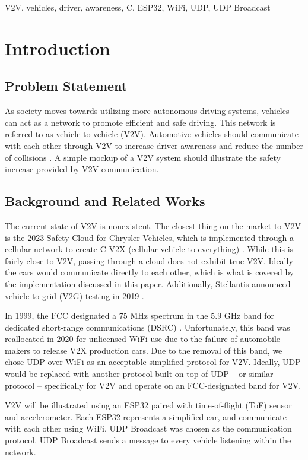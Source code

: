 \documentclass[conference]{IEEEtran}
\begin{document}
\begin{IEEEkeywords}
V2V, vehicles, driver, awareness, C, ESP32, WiFi, UDP, UDP Broadcast
\end{IEEEkeywords}

\section{Introduction}
\subsection{Problem Statement}
As society moves towards utilizing more autonomous driving systems, vehicles can
act as a network to promote efficient and safe driving. This network is referred
to as vehicle-to-vehicle (V2V). Automotive vehicles should communicate with each
other through V2V to increase driver awareness and reduce the number of
collisions \cite{nhtsa_v2v}. A simple mockup of a V2V system should illustrate the
safety increase provided by V2V communication.

\subsection{Background and Related Works}
The current state of V2V is nonexistent. The closest thing on the market to V2V
is the 2023 Safety Cloud for Chrysler Vehicles, which is implemented through a
cellular network to create C-V2X (cellular vehicle-to-everything)
\cite{stone_2023, haas}.  While this is fairly close to V2V, passing through a
cloud does not exhibit true V2V. Ideally the cars would communicate directly to
each other, which is what is covered by the implementation discussed in this
paper. Additionally, Stellantis announced vehicle-to-grid (V2G) testing in 2019
\cite{media.stellantis_2020}.

In 1999, the FCC designated a 75 MHz spectrum in the 5.9 GHz band for dedicated
short-range communications (DSRC) \cite{hawkins_2022}. Unfortunately, this band was
reallocated in 2020 for unlicensed WiFi \cite{hawkins_2022} use due to the
failure of automobile makers to release V2X production cars. Due to the removal
of this band, we chose UDP over WiFi as an acceptable simplified protocol for
V2V. Ideally, UDP would be replaced with another protocol built on top of UDP --
or similar protocol -- specifically for V2V and operate on an FCC-designated
band for V2V.

V2V will be illustrated using an ESP32 paired with time-of-flight (ToF) sensor
and accelerometer. Each ESP32 represents a simplified car, and communicate with
each other using WiFi. UDP Broadcast was chosen as the communication protocol. 
UDP Broadcast sends a message to every vehicle listening within the network.
\end{document}
